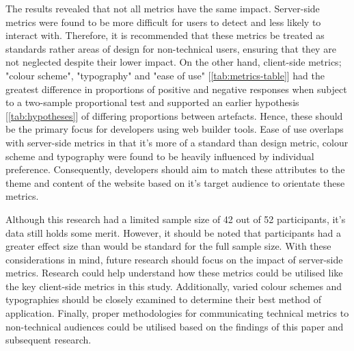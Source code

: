 \documentclass[article]{IEEEtran}
\begin{document}
        The results revealed that not all metrics have the same impact. Server-side metrics were found to be more difficult for users to detect and less likely to interact with. Therefore, it is recommended that these metrics be treated as standards rather areas of design for non-technical users, ensuring that they are not neglected despite their lower impact. On the other hand, client-side metrics; "colour scheme", "typography" and "ease of use" [\autoref{tab:metrics-table}] had the greatest difference in proportions of positive and negative responses when subject to a two-sample proportional test and supported an earlier hypothesis [\autoref{tab:hypotheses}] of differing proportions between artefacts. Hence, these should be the primary focus for developers using web builder tools. Ease of use overlaps with server-side metrics in that it's more of a standard than design metric, colour scheme and typography were found to be heavily influenced by individual preference. Consequently, developers should aim to match these attributes to the theme and content of the website based on it's target audience to orientate these metrics.
        
        Although this research had a limited sample size of 42 out of 52 participants, it's data still holds some merit. However, it should be noted that participants had a greater effect size than would be standard for the full sample size. With these considerations in mind, future research should focus on the impact of server-side metrics. Research could help understand how these metrics could be utilised like the key client-side metrics in this study. Additionally, varied colour schemes and typographies should be closely examined to determine their best method of application. Finally, proper methodologies for communicating technical metrics to non-technical audiences could be utilised based on the findings of this paper and subsequent research.
\end{document}
